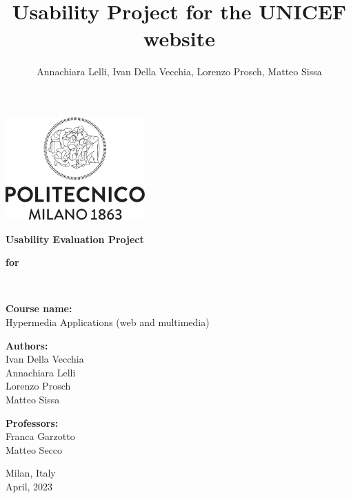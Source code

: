 \documentclass[a4paper,12pt]{article}
\author{Annachiara Lelli, Ivan Della Vecchia, Lorenzo Prosch, Matteo Sissa}
\title{Usability Project for the UNICEF website}
\newcommand{\inspectionDir}{root/1.Inspection}
\newcommand{\utDir}{root/2.UserTesting}
\newcommand{\conclusionDir}{root/3.Conclusion}
\newcommand{\annexDir}{root/4.Annex}
\begin{document}
	
	\begin{center}
		
		
	\thispagestyle{empty}
		
	\includegraphics[width=0.4\textwidth]{res/Logo_poli}
	
	\vspace{2cm}
	
	\textbf{\fontsize{28}{\baselineskip}\selectfont Usability Evaluation Project}\\
	
	\vspace{0.6cm}
	
	\textbf{\fontsize{17}{\baselineskip}\selectfont for }\\
	
	\vspace{0.6cm}
	
	\textbf{\fontsize{28}{\baselineskip}\selectfont {UNICEF's website}}\\
	
	\vspace{2cm}
	
	\textbf{Course name:}\\ 	{
		\setlength{\baselineskip}{1.4\baselineskip}
		Hypermedia Applications (web and multimedia)\\	
	}
	
	\vspace{1cm}
	
	
		\textbf{Authors:}\\
	{
		\setlength{\baselineskip}{1.4\baselineskip}
		Ivan Della Vecchia\\
		Annachiara Lelli\\
		Lorenzo Prosch\\
		Matteo Sissa	\\
	}
	
	\vspace{1cm}
	
	\textbf{Professors:}\\
	{
	\setlength{\baselineskip}{1.4\baselineskip}
	Franca Garzotto\\
	Matteo Secco\\
}
	
	\vspace{3cm}
	

	{\scriptsize Milan, Italy \\ April, 2023}
	
	\end{center}
	
	
	\clearpage
 	\hypersetup{linkcolor=black}
	\tableofcontents
	\thispagestyle{empty}
	
	
	\renewcommand{\rmdefault}{phv}
	\renewcommand{\normalsize}{\fontsize{14}{17.4}\selectfont}
	
	
	
	
	
	
	
\end{document}

